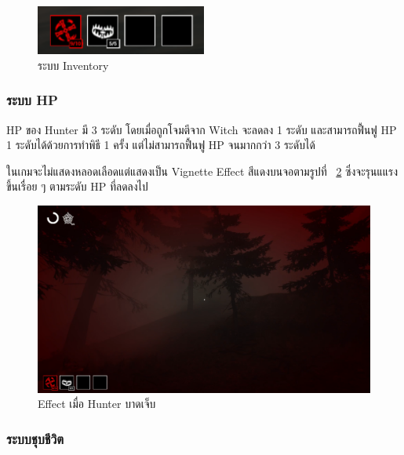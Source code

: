 \begin{figure}[h]
  \begin{center}
  \includegraphics[width=0.5\textwidth]{./img/mechanics/inventory.png}
  \end{center}
  \caption[ระบบ Inventory]{ระบบ Inventory}
  \label{fig:inventory}
\end{figure}

\subsubsection{ระบบ HP}

HP ของ Hunter มี 3 ระดับ โดยเมื่อถูกโจมตีจาก Witch จะลดลง 1 ระดับ และสามารถฟื้นฟู HP 1 ระดับได้ด้วยการทำพิธี 
1 ครั้ง แต่ไม่สามารถฟื้นฟู HP จนมากกว่า 3 ระดับได้

ในเกมจะไม่แสดงหลอดเลือดแต่แสดงเป็น Vignette Effect สีแดงบนจอตามรูปที่ ~\ref{fig:damage_effect} ซึ่งจะรุนแแรงขึ้นเรื่อย ๆ ตามระดับ HP ที่ลดลงไป

\begin{figure}[p]
  \begin{center}
  \includegraphics[width=\textwidth]{./img/mechanics/damage_effect.png}
  \end{center}
  \caption[Effect เมื่อ Hunter บาดเจ็บ]{Effect เมื่อ Hunter บาดเจ็บ}
  \label{fig:damage_effect}
\end{figure}

\subsubsection{ระบบชุบชีวิต}


